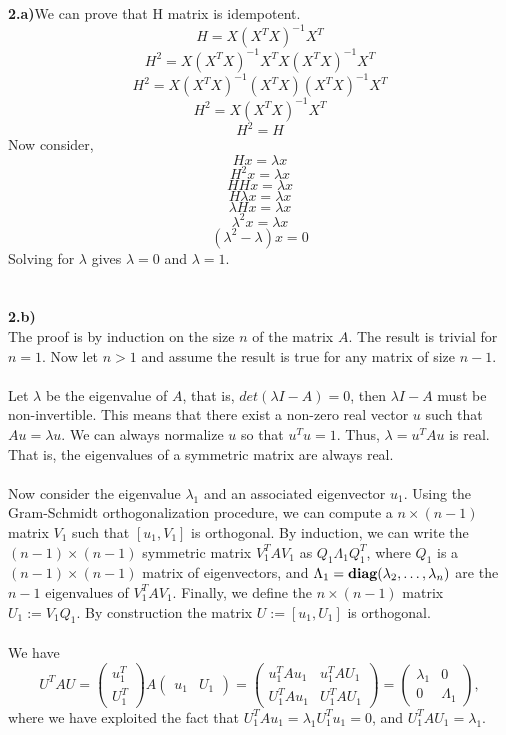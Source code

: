 \documentclass[17pt]{article}
\begin{document}
\textbf{2.a)}We can prove that H matrix is idempotent.
\\ $$H=X\left(X ^{T}X\right)^{-1}X ^{T}$$
$$H^{2}=X\left(X ^{T}X\right)^{-1}X ^{T}X\left(X ^{T}X\right)^{-1}X ^{T}$$
$$H^{2}=X\left(X ^{T}X\right)^{-1}(X ^{T}X)\left(X ^{T}X\right)^{-1}X ^{T}$$
$$H^{2}=X\left(X ^{T}X\right)^{-1}X ^{T}$$
$$H^{2}=H$$
Now consider,\\
$$Hx=\lambda x$$
$$H^{2}x=\lambda x$$
$$HHx=\lambda x$$
$$H\lambda x=\lambda x$$
$$\lambda Hx=\lambda x$$
$$\lambda^{2} x=\lambda x$$
$$(\lambda^{2}-\lambda) x=0$$
Solving for $\lambda$ gives $\lambda = 0$ and $\lambda = 1$.\\
\\
\\
\textbf{2.b)}\\
The proof is by induction on the size $n$ of the matrix $A$. The result is trivial for $n = 1$. Now let $n>1$ and assume the result is true for any matrix of size $n-1$.\\
\\
Let $\lambda$ be the eigenvalue of $A$, that is, $det(\lambda I - A) = 0$, then $\lambda I - A$ must be non-invertible. This means that there exist a non-zero real vector $u$ such that $A u = \lambda u$. We can always normalize $u$ so that $u^Tu = 1$. Thus, $\lambda = u^TAu$ is real. That is, the eigenvalues of a symmetric matrix are always real.\\
\\
Now consider the eigenvalue $\lambda_1$ and an associated eigenvector $u_1$. Using the Gram-Schmidt orthogonalization procedure, we can compute a $n\times(n-1)$ matrix $V_1$ such that $[u_1,V_1]$ is orthogonal. By induction, we can write the $(n-1)\times(n-1)$ symmetric matrix $V_1^TAV_1$ as $Q_1 \Lambda_1 Q_1^T$, where $Q_1$ is a $(n-1)\times(n-1)$ matrix of eigenvectors, and $\Lambda_1 = \mbox{\bf diag}(\lambda_2,\ldots,\lambda_n)$ are the $n-1$ eigenvalues of $V_1^TAV_1$. Finally, we define the $n\times (n-1)$ matrix $U_1 := V_1Q_1$. By construction the matrix $U := [u_1,U_1]$ is orthogonal.\\
\\
We have
\begin{equation*}
U^TAU = \left( \begin{array}{c} u_1^T\\ U_1^T \end{array}\right)A \left( \begin{array}{cc} u_1 & U_1 \end{array}\right) = \left( \begin{array}{cc} u_1^TAu_1 & u_1^TAU_1\\ U_1^TAu_1 & U_1^TAU_1 \end{array} \right) = \left( \begin{array}{cc} \lambda_1 & 0\\ 0 & \Lambda_1 \end{array}\right), 
\end{equation*}where we have exploited the fact that $U_1^TAu_1 = \lambda_1 U_1^Tu_1 = 0$, and $U_1^TAU_1 = \lambda_1$.\\
\end{document}
